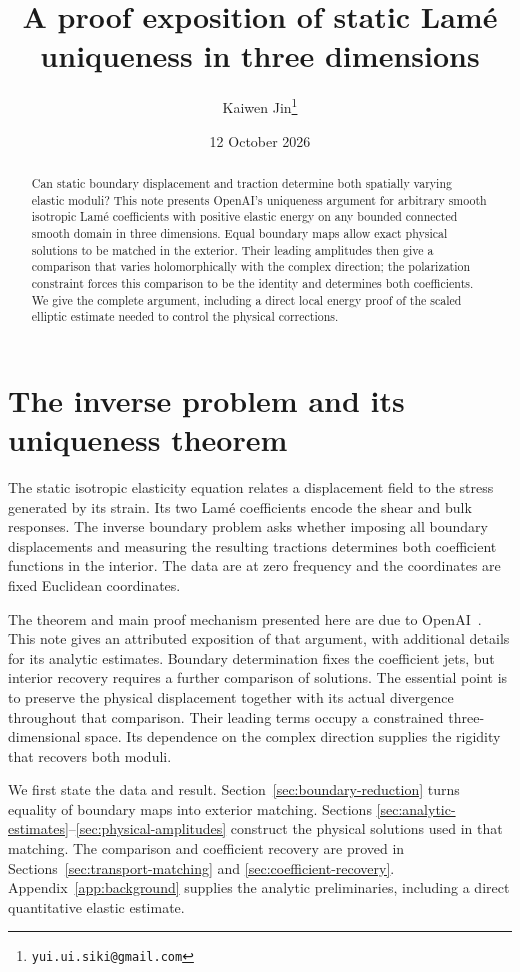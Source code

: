 \documentclass[11pt]{article}
\title{A proof exposition of static Lam\'e uniqueness in three dimensions}
\author{Kaiwen Jin\thanks{\texttt{yui.ui.siki@gmail.com}}}
\date{12 October 2026}
\theoremstyle{remark}
\numberwithin{equation}{section}
\begin{document}
\maketitle
\begin{abstract}
Can static boundary displacement and traction determine both spatially
varying elastic moduli? This note presents OpenAI's uniqueness argument for
arbitrary smooth isotropic Lam\'e coefficients with positive elastic energy
on any bounded connected smooth domain in three dimensions. Equal boundary
maps allow exact physical solutions to be matched in the exterior. Their
leading amplitudes then give a comparison that varies holomorphically with
the complex direction; the polarization constraint forces this comparison
to be the identity and determines both coefficients. We give the complete
argument, including a direct local energy proof of the scaled elliptic
estimate needed to control the physical corrections.
\end{abstract}
\tableofcontents
\section{The inverse problem and its uniqueness theorem}\label{sec:introduction}


The static isotropic elasticity equation relates a displacement field to
the stress generated by its strain. Its two Lam\'e coefficients encode the
shear and bulk responses. The inverse boundary problem asks whether imposing
all boundary displacements and measuring the resulting tractions determines
both coefficient functions in the interior. The data are at zero frequency
and the coordinates are fixed Euclidean coordinates.

The theorem and main proof mechanism presented here are due to
OpenAI~\cite{OpenAI2026}. This note gives an attributed exposition of that
argument, with additional details for its analytic estimates. Boundary
determination fixes the coefficient jets, but interior recovery requires a
further comparison of solutions. The essential point is to preserve the
physical displacement together with its actual divergence throughout that
comparison. Their leading terms occupy a constrained three-dimensional
space. Its dependence on the complex direction supplies the rigidity that
recovers both moduli.

We first state the data and result. Section~\ref{sec:boundary-reduction}
turns equality of boundary maps into exterior matching. Sections
\ref{sec:analytic-estimates}--\ref{sec:physical-amplitudes} construct the
physical solutions used in that matching. The comparison and coefficient
recovery are proved in Sections~\ref{sec:transport-matching} and
\ref{sec:coefficient-recovery}. Appendix~\ref{app:background} supplies
the analytic preliminaries, including a direct quantitative elastic estimate.
\end{document}
